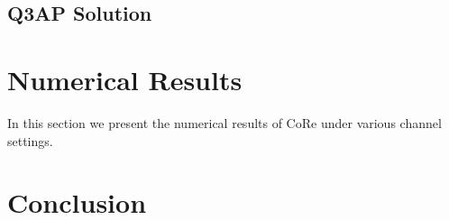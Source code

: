 \documentclass[conference]{IEEEtran}
\begin{document}
\subsection{Q3AP Solution}

\section{Numerical Results}
\label{sec:simulation}
In this section we present the numerical results of CoRe under various channel
settings. 






\section{Conclusion}
\label{sec:conclusion}















%




\end{document}
